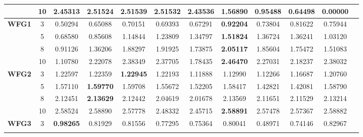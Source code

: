 \documentclass{sig-alternate}
\begin{document}
\begin{table}[!htb]
\begin{tabular}{|c|c|c|c|c|c|c|c|c|c|c|c|}
& 10         & 2.45313          & 2.51524           & \textbf{2.51539}      & 2.51532          & 2.43536             & 1.56890             & 0.95488            & 0.64498              & 0.00000          \\ \hline
\multirow{4}{*}{\textbf{WFG1}}  & 3          & 0.50294          & 0.65088           & 0.70151               & 0.69393          & 0.67291             & \textbf{0.92204}    & 0.73804            & 0.81622              & 0.75944          \\ \cline{2-11} 
& 5          & 0.68580          & 0.85608           & 1.14844               & 1.23809          & 1.34797             & \textbf{1.51824}    & 1.36724            & 1.36241              & 1.03120          \\ \cline{2-11} 
& 8          & 0.91126          & 1.36206           & 1.88297               & 1.91925          & 1.73875             & \textbf{2.05117}    & 1.85604            & 1.75472              & 1.51083          \\ \cline{2-11} 
& 10         & 1.10780          & 2.22078           & 2.38349               & 2.37705          & 1.78435             & \textbf{2.46470}    & 2.27031            & 2.18237              & 2.38032          \\ \hline
\multirow{4}{*}{\textbf{WFG2}}  & 3          & 1.22597          & 1.22359           & \textbf{1.22945}      & 1.22193          & 1.11888             & 1.12990             & 1.12266            & 1.16687              & 1.20760          \\ \cline{2-11} 
& 5          & 1.57110          & \textbf{1.59770}  & 1.59708               & 1.55672          & 1.52205             & 1.58417             & 1.42821            & 1.42081              & 1.58790          \\ \cline{2-11} 
& 8          & 2.12451          & \textbf{2.13629}  & 2.12442               & 2.04619          & 2.01678             & 2.13569             & 2.11651            & 2.11529              & 2.13214          \\ \cline{2-11} 
& 10         & 2.58524          & 2.58890           & 2.57778               & 2.48332          & 2.45715             & \textbf{2.58891}    & 2.57478            & 2.57367              & 2.58882          \\ \hline
\multirow{4}{*}{\textbf{WFG3}}  & 3          & \textbf{0.98265} & 0.81929           & 0.81556               & 0.77295          & 0.75364             & 0.80041             & 0.48971            & 0.74146              & 0.82967          \\ \cline{2-11} 

\end{tabular}
\end{table}
\end{document}
